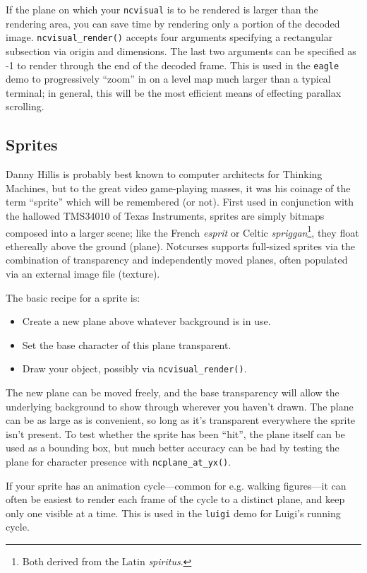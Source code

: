 \documentclass[letterpaper,10pt]{article}
\newenvironment{denseitemize}{
  \begin{itemize}
      \setlength{\itemsep}{0pt}
}{
  \end{itemize}
}
\begin{document}
If the plane on which your \texttt{ncvisual} is to be rendered is larger than
the rendering area, you can save time by rendering only a portion of the
decoded image. \texttt{ncvisual\_render()} accepts four arguments specifying a
rectangular subsection via origin and dimensions. The last two arguments can be
specified as -1 to render through the end of the decoded frame. This is used
in the \texttt{eagle} demo to progressively ``zoom'' in on a level map much
larger than a typical terminal; in general, this will be the most efficient means
of effecting parallax scrolling.

\subsection{Sprites}
Danny Hillis is probably best known to computer architects for Thinking Machines,
but to the great video game-playing masses, it was his coinage of the term
``sprite'' which will be remembered (or not)\cite{tms34010}. First used in
conjunction with the hallowed TMS34010 of Texas Instruments, sprites are simply
bitmaps composed into a larger scene; like the French \textit{esprit} or Celtic
\textit{spriggan}\footnote{Both derived from the Latin \textit{spiritus}.}, they
float ethereally above the ground (plane). Notcurses supports full-sized sprites
via the combination of transparency and independently moved planes, often
populated via an external image file (texture).

The basic recipe for a sprite is:
\begin{denseitemize}
\item{Create a new plane above whatever background is in use.}
\item{Set the base character of this plane transparent.}
\item{Draw your object, possibly via \texttt{ncvisual\_render()}.}
\end{denseitemize}
The new plane can be moved freely, and the base transparency will allow the
underlying background to show through wherever you haven't drawn. The plane can
be as large as is convenient, so long as it's transparent everywhere the
sprite isn't present. To test whether the sprite has been ``hit'', the plane
itself can be used as a bounding box, but much better accuracy can be had by
testing the plane for character presence with \texttt{ncplane\_at\_yx()}.

If your sprite has an animation cycle---common for e.g. walking figures---it
can often be easiest to render each frame of the cycle to a distinct plane,
and keep only one visible at a time. This is used in the \texttt{luigi} demo
for Luigi's running cycle.
\end{document}
